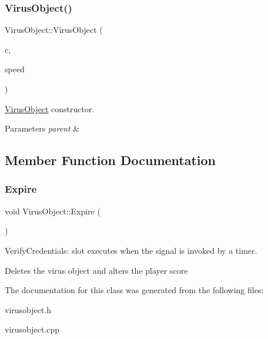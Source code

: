 \subsubsection{\texorpdfstring{Virus\+Object()}{VirusObject()}}
{\footnotesize\ttfamily Virus\+Object\+::\+Virus\+Object (\begin{DoxyParamCaption}\item[{Virus\+Object\+::\+Color}]{c,  }\item[{double}]{speed }\end{DoxyParamCaption})}



\hyperlink{classVirusObject}{Virus\+Object} constructor. 


\begin{DoxyParams}{Parameters}
{\em parent} & \\
\hline
\end{DoxyParams}


\subsection{Member Function Documentation}
\mbox{\label{classVirusObject_a90bb071dbf5c8ec544466f1e5b8fa7ac}} 
\subsubsection{\texorpdfstring{Expire}{Expire}}
{\footnotesize\ttfamily void Virus\+Object\+::\+Expire (\begin{DoxyParamCaption}{ }\end{DoxyParamCaption})\hspace{0.3cm}{\ttfamily [slot]}}



Verify\+Credentials\+: slot executes when the signal is invoked by a timer. 

Deletes the virus object and alters the player score 

The documentation for this class was generated from the following files\+:\begin{DoxyCompactItemize}
\item 
virusobject.\+h\item 
virusobject.\+cpp\end{DoxyCompactItemize}
